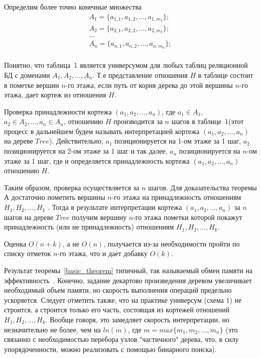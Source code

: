 Определим более точно конечные множества 
\begin{equation}
\begin{array}{c}
A_1 = \{a_{1,1}, a_{1,2}, ..., a_{1,m_1}\}; \\
A_2 = \{ a_{2,1}, a_{2,2}, ..., a_{2,m_2}\}; \\
\dots \\
A_n = \{ a_{n,1}, a_{n,2}, ..., a_{n,m_n}\}; \\
\end{array}
\end{equation}


Понятно, что таблица~1 является универсумом для любых таблиц реляционной БД с доменами $A_1, A_2,\ldots,A_n$. Т.е представление отношения $H$ в таблице состоит в пометке вершин $n$-го этажа, если путь от корня дерева до этой вершины $n$-го этажа, дает кортеж из отношения $H$.

Проверка принадлежности кортежа $(a_1,a_2, ..., a_n)$, где $a_1 \in A_1$, $a_2 \in A_2, ..., a_n \in A_n$, отношению $H$ производится за $n$ шагов в таблице~1(этот процесс в дальнейшем будем называть интерпретацией кортежа $(a_1,a_2, ..., a_n)$ на дереве $Tree$). Действительно, $a_1$ позиционируется на 1-ом этаже за 1 шаг, $a_2$ позиционируется на 2-ом этаже за 1 шаг и так далее, $a_n$ позиционируется на $n$-ом этаже за 1 шаг, где и определяется принадлежность кортежа $(a_1,a_2, ..., a_n)$ отношению $H$.

Таким образом, проверка осуществляется за $n$ шагов. Для доказательства теоремы $А$ достаточно пометить вершины $n$-го этажа на принадлежность отношениям $H_1, H_2, ..., H_k$ . Тогда в результате интерпретации кортежа $(a_1,a_2, ..., a_n)$ за $n$ шагов на дереве $Tree$ получим вершину $n$-го этажа пометки которой покажут принадлежность (или не принадлежность) отношениям $H_1, H_2, ..., H_k$.

Оценка $O(n+k)$, а не $O(n)$, получается из-за необходимости пройти по списку отметок $n$-го этажа, что и дает добавку $O(k)$.

\begin{remark}
Результат теоремы~\ref{basic_theorem} типичный, так называемый обмен памяти на эффективность~\cite{D11}.
Конечно, задание декартово произведения деревом увеличивает необходимый объем памяти, но скорость выполнения операций предельно ускоряется. Следует отметить также, что на практике универсум (схема 1) не строится, а строится только его часть, состоящая из кортежей отношений $H_1, H_2, ..., H_k$. Вообще говоря, это замедляет скорость интерпретации, но незначительно не более, чем на $ln(m)$, где $m = max\{ m_1, m_2, …, m_n\}$ 
(это связанно с необходимостью перебора узлов "частичного" дерева, что, в силу упорядоченности, можно реализовать с помощью бинарного поиска).
\end{remark}


